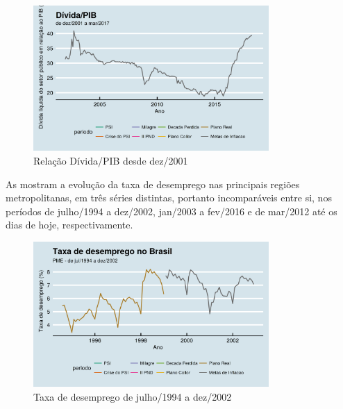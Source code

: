 \documentclass[
	10pt,				%
	openright,			%
	twoside,			%
	a5paper,			%
	english,			%
	french,				%
	spanish,			%
	brazil				%
	]{abntex2}
\begin{document}
\begin{figure}[htbp]
\caption{Relação Dívida/PIB desde dez/2001}\label{dividapib}
\begin{center}
\includegraphics[width=0.80000\textwidth]{imagens/dividapib-1.png}
\end{center}
\end{figure}

As  mostram a evolução da
taxa de desemprego nas principais regiões metropolitanas, em três séries
distintas, portanto incomparáveis entre si, nos períodos de julho/1994 a
dez/2002, jan/2003 a fev/2016 e de mar/2012 até os dias de hoje,
respectivamente.

\begin{figure}[htbp]
\caption{Taxa de desemprego de julho/1994 a dez/2002}\label{desemprego1}
\begin{center}
\includegraphics[width=0.80000\textwidth]{imagens/desemprego1-1.png}
\end{center}
\end{figure}
\end{document}
